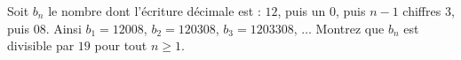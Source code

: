 Soit $b_n$ le nombre dont l'écriture décimale est : $12$, puis un $0$, puis
$n-1$ chiffres $3$, puis $08$. Ainsi $b_1 = 12008$, $b_2 = 120308$,
$b_3 = 1203308$, $\ldots$ Montrez que $b_n$ est divisible par $19$ pour tout
$n \geq 1$.

